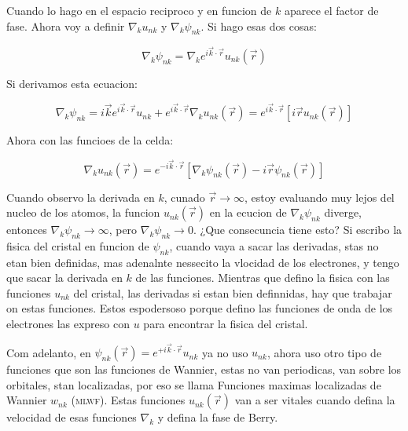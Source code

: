 \documentclass[11pt,fleqn]{book}
\begin{document}
Cuando lo hago en el espacio reciproco y en funcion de $k$ aparece el factor de fase. Ahora voy a definir $\nabla_{k}u_{nk}$ y $\nabla_{k}\psi_{nk}$. Si hago esas dos cosas:

\begin{equation}
    \nabla_{k}\psi_{nk}=\nabla_{k}e^{i\vec{k}\cdot\vec{r}}u_{nk}(\vec{r})
\end{equation}

Si derivamos esta ecuacion:

\begin{equation}
    \nabla_{k}\psi_{nk}=i\vec{k}e^{i\vec{k}\cdot\vec{r}}u_{nk}+e^{i\vec{k}\cdot\vec{r}}\nabla_{k}u_{nk}(\vec{r})=e^{i\vec{k}\cdot\vec{r}}\left[i\vec{r}u_{nk}(\vec{r})\right]
\end{equation}

Ahora con las funcioes de la celda:

\begin{equation}
    \nabla_{k}u_{nk}(\vec{r})=e^{-i\vec{k}\cdot\vec{r}}\left[\nabla_{k}\psi_{nk}(\vec{r})-i\vec{r}\psi_{nk}(\vec{r})\right]
\end{equation}

Cuando observo la derivada en $k$, cunado $\vec{r}\rightarrow\infty$, estoy evaluando muy lejos del nucleo de los atomos, la funcion $u_{nk}(\vec{r})$ en la ecucion de $\nabla_{k}\psi_{nk}$ diverge, entonces $\nabla_{k}\psi_{nk}\rightarrow\infty$, pero $\nabla_{k}\psi_{nk}\rightarrow0$. ¿Que consecuncia tiene esto? Si escribo la fisica del cristal en funcion de $\psi_{nk}$, cuando vaya a sacar las derivadas, stas no etan bien definidas, mas adenalnte nessecito la vlocidad de los electrones, y tengo que sacar la derivada en $k$ de las funciones. Mientras que defino la fisica con las funciones $u_{nk}$ del cristal, las derivadas si estan bien definnidas, hay que trabajar on estas funciones. Estos espodersoso porque defino las funciones de onda de los electrones las expreso con $u$ para encontrar la fisica del cristal.

Com adelanto, en $\psi_{nk}(\vec{r})=e^{+i\vec{k}\cdot\vec{r}}u_{nk}$ ya no uso $u_{nk}$, ahora uso otro tipo de funciones que son las funciones de Wannier, estas no van periodicas, van sobre los orbitales, stan localizadas, por eso se llama Funciones maximas localizadas de Wannier $w_{nk}$ (\textsc{mlwf}). Estas funciones $u_{nk}(\vec{r})$ van a ser vitales cuando defina la velocidad de esas funciones $\nabla_{k}$ y defina la fase de Berry.

\end{document}

